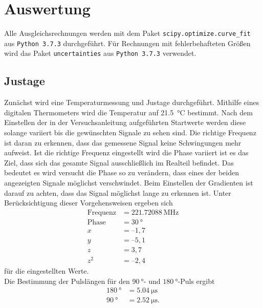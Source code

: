 \section{Auswertung}

Alle Ausgleichsrechnungen werden mit dem Paket \texttt{scipy.optimize.curve\_fit}  aus \texttt{Python 3.7.3} durchgeführt.
Für Rechnungen mit fehlerbehafteten Größen wird das Paket \texttt{uncertainties} aus \texttt{Python 3.7.3} verwendet.\\

\subsection{Justage}
Zunächst wird eine Temperaturmessung und Justage durchgeführt. Mithilfe eines digitalen Thermometers wird die Temperatur
auf \SI{21.5}{\degreeCelsius} bestimmt. Nach dem Einstellen der in der Versuchsanleitung \cite{anleitung} aufgeführten Startwerte
werden diese solange variiert bis die gewünschten Signale zu sehen sind.
Die richtige Frequenz ist daran zu erkennen, dass das gemessene Signal keine Schwingungen mehr aufweist. Ist die richtige Frequenz
eingestellt wird die Phase variiert ist es das Ziel, dass sich das gesamte Signal ausschließlich im Realteil befindet.
Das bedeutet es wird versucht die Phase so zu verändern, dass eines der beiden angezeigten Signale möglichst verschwindet.
Beim Einstellen der Gradienten ist darauf zu achten, dass das Signal möglichst lange zu erkennen ist.
Unter Berücksichtigung dieser Vorgehensweisen ergeben sich
\begin{align*}
  \text{Frequenz}&=\SI{221.72088}{\mega\hertz} \\
  \text{Phase} &= \SI{30}{\degree} \\
    x&=–1,7 \\
    y&=–5,1 \\
    z&=3,7 \\
    z^2 &=–2,4
\end{align*} \noindent
für die eingestellten Werte. \\
Die Bestimmung der Pulslängen für den $\SI{90}{\degree}$- und $\SI{180}{\degree}$-Puls ergibt
\begin{align*}
  \SI{180}{\degree} &= \SI{5.04}{\micro\second}\\
  \SI{90}{\degree}  &= \SI{2.52}{\micro\second}.
\end{align*} \noindent

